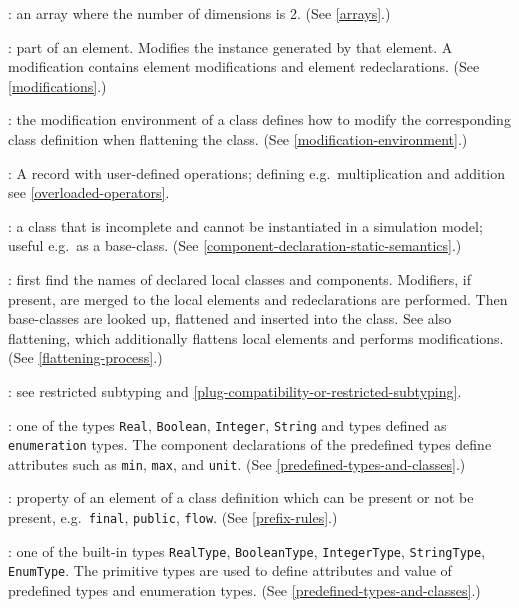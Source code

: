 : an array where the number of dimensions is 2. (See
\cref{arrays}.)

: part of an element. Modifies the instance
generated by that element. A modification contains element modifications
and element redeclarations. (See \cref{modifications}.)

: the modification environment of a
class defines how to modify the corresponding class definition when
flattening the class. (See \cref{modification-environment}.)

: A record with user-defined operations;
defining e.g.\ multiplication and addition see \cref{overloaded-operators}.

: a class that is incomplete and cannot be instantiated
in a simulation model; useful e.g.\ as a base-class. (See \cref{component-declaration-static-semantics}.)

: first find the names of declared local
classes and components. Modifiers, if present, are merged to the local
elements and redeclarations are performed. Then base-classes are looked
up, flattened and inserted into the class. See also flattening, which
additionally flattens local elements and performs modifications. (See
\cref{flattening-process}.)

: see restricted subtyping and \cref{plug-compatibility-or-restricted-subtyping}.

: one of the types \lstinline!Real!, \lstinline!Boolean!, \lstinline!Integer!,
\lstinline!String! and types defined as \lstinline!enumeration! types. The component
declarations of the predefined types define attributes such as \lstinline!min!, \lstinline!max!,
and \lstinline!unit!. (See \cref{predefined-types-and-classes}.)

: property of an element of a class definition which can
be present or not be present, e.g.\ \lstinline!final!, \lstinline!public!, \lstinline!flow!. (See \cref{prefix-rules}.)

: one of the built-in types \lstinline!RealType!,
\lstinline!BooleanType!, \lstinline!IntegerType!, \lstinline!StringType!, \lstinline!EnumType!. The primitive types are
used to define attributes and value of predefined types and enumeration
types. (See \cref{predefined-types-and-classes}.)

